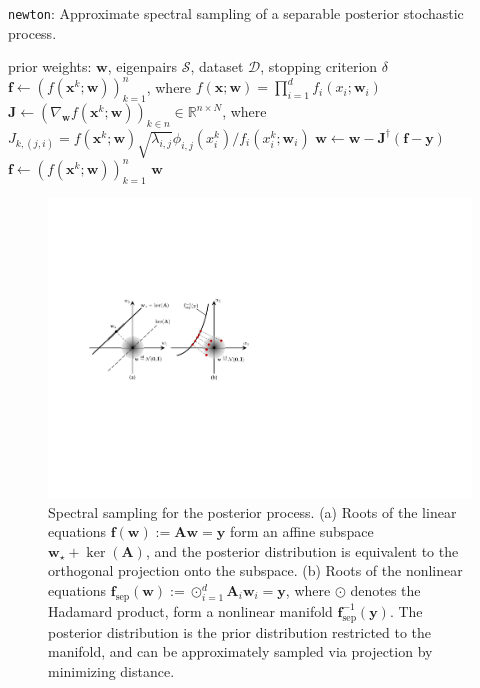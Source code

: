 \documentclass{article}
\begin{document}
\begin{algorithm}[h]
  \caption{\texttt{newton}: Approximate spectral sampling
    of a separable posterior stochastic process.}
  \label{alg:newton}
  \begin{algorithmic}[1] %
    \Input prior weights: $\mathbf{w}$, eigenpairs $\mathcal{S}$,
    dataset $\mathcal{D}$, stopping criterion $\delta$
    \State $\mathbf{f} \gets (f(\mathbf{x}^k; \mathbf{w}))_{k=1}^n$, where
    $f(\mathbf{x}; \mathbf{w}) = \prod_{i=1}^d f_i(x_i; \mathbf{w}_i)$
      \State $\mathbf{J} \gets (\nabla_{\mathbf{w}} f(\mathbf{x}^k; \mathbf{w}))_{k \in n}
      \in \mathbb{R}^{n \times N}$, where $J_{k,(j,i)} =
      {f(\mathbf{x}^k; \mathbf{w})} \sqrt{\lambda_{i,j}} \phi_{i,j}(x_i^k) / {f_i(x_i^k; \mathbf{w}_i)}$
      \State $\mathbf{w} \gets \mathbf{w} - \mathbf{J}^\dagger (\mathbf{f} - \mathbf{y})$
      \State $\mathbf{f} \gets (f(\mathbf{x}^k; \mathbf{w}))_{k=1}^n$
    \EndWhile
    \Output $\mathbf{w}$
  \end{algorithmic}
\end{algorithm}

\begin{figure}[t]
  \centering
  \includegraphics[width=0.75\linewidth]{img/projection.pdf}
  \caption{Spectral sampling for the posterior process.
    (a) Roots of the linear equations $\mathbf{f}(\mathbf{w}) := \mathbf{A} \mathbf{w} = \mathbf{y}$
    form an affine subspace $\mathbf{w}_\star + \ker(\mathbf{A})$,
    and the posterior distribution is equivalent to the orthogonal projection onto the subspace.
    (b) Roots of the nonlinear equations $\mathbf{f}_{\mathrm{sep}}(\mathbf{w}) :=
    \odot_{i=1}^d \mathbf{A}_i \mathbf{w}_i = \mathbf{y}$, where $\odot$ denotes the Hadamard product,
    form a nonlinear manifold $\mathbf{f}_{\mathrm{sep}}^{-1}(\mathbf{y})$.
    The posterior distribution is the prior distribution restricted to the manifold,
    and can be approximately sampled via projection by minimizing distance.}
  \label{fig:projection}
\end{figure}
\end{document}
